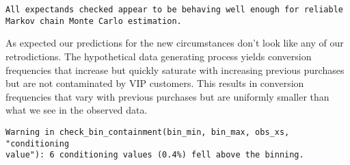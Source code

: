 \documentclass[
  letterpaper,
  DIV=11,
  numbers=noendperiod]{scrartcl}
\newenvironment{Shaded}{\begin{snugshade}}{\end{snugshade}}
\newcommand{\AttributeTok}[1]{\textcolor[rgb]{0.40,0.45,0.13}{#1}}
\newcommand{\ControlFlowTok}[1]{\textcolor[rgb]{0.00,0.23,0.31}{#1}}
\newcommand{\DecValTok}[1]{\textcolor[rgb]{0.68,0.00,0.00}{#1}}
\newcommand{\FunctionTok}[1]{\textcolor[rgb]{0.28,0.35,0.67}{#1}}
\newcommand{\NormalTok}[1]{\textcolor[rgb]{0.00,0.23,0.31}{#1}}
\newcommand{\OtherTok}[1]{\textcolor[rgb]{0.00,0.23,0.31}{#1}}
\newcommand{\SpecialCharTok}[1]{\textcolor[rgb]{0.37,0.37,0.37}{#1}}
\newcommand{\StringTok}[1]{\textcolor[rgb]{0.13,0.47,0.30}{#1}}
\begin{document}
\begin{verbatim}
All expectands checked appear to be behaving well enough for reliable
Markov chain Monte Carlo estimation.
\end{verbatim}

As expected our predictions for the new circumstances don't look like
any of our retrodictions. The hypothetical data generating process
yields conversion frequencies that increase but quickly saturate with
increasing previous purchases but are not contaminated by VIP customers.
This results in conversion frequencies that vary with previous purchases
but are uniformly smaller than what we see in the observed data.

\begin{Shaded}
\end{Shaded}

\begin{verbatim}
Warning in check_bin_containment(bin_min, bin_max, obs_xs, "conditioning
value"): 6 conditioning values (0.4%) fell above the binning.
\end{verbatim}
\end{document}
